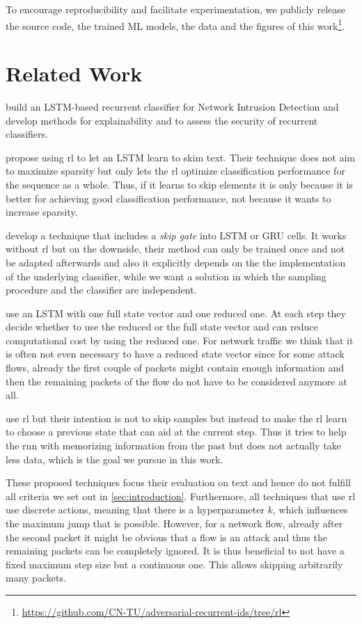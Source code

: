\documentclass[conference]{IEEEtran}
\begin{document}
To encourage reproducibility and facilitate experimentation, we publicly release the source code, the trained ML models, the data and the figures of this work\footnote{\url{https://github.com/CN-TU/adversarial-recurrent-ids/tree/rl}}.

\section{Related Work}

\cite{hartl_explainability_2019} build an LSTM-based \cite{hochreiter_long_1997} recurrent classifier for Network Intrusion Detection and develop methods for explainability and to assess the security of recurrent classifiers.

\cite{yu_learning_2017} propose using \gls{rl} to let an LSTM learn to skim text. Their technique does not aim to maximize sparsity but only lets the \gls{rl} optimize classification performance for the sequence as a whole. Thus, if it learns to skip elements it is only because it is better for achieving good classification performance, not because it wants to increase sparsity.

\cite{campos_skip_2018} develop a technique that includes a \textit{skip gate} into LSTM or GRU \cite{cho_learning_2014} cells. It works without \gls{rl} but on the downside, their method can only be trained once and not be adapted afterwards and also it explicitly depends on the the implementation of the underlying classifier, while we want a solution in which the sampling procedure and the classifier are independent.

\cite{seo_neural_2018} use an LSTM with one full state vector and one reduced one. At each step they decide whether to use the reduced or the full state vector and can reduce computational cost by using the reduced one. For network traffic we think that it is often not even necessary to have a reduced state vector since for some attack flows, already the first couple of packets might contain enough information and then the remaining packets of the flow do not have to be considered anymore at all.

\cite{gui_long_2018} use \gls{rl} but their intention is not to skip samples but instead to make the \gls{rl} learn to choose a previous state that can aid at the current step. Thus it tries to help the \gls{rnn} with memorizing information from the past but does not actually take less data, which is the goal we pursue in this work.

These proposed techniques focus their evaluation on text and hence do not fulfill all criteria we set out in \autoref{sec:introduction}. Furthermore, all techniques that use \gls{rl} use discrete actions, meaning that there is a hyperparameter $k$, which influences the maximum jump that is possible. However, for a network flow, already after the second packet it might be obvious that a flow is an attack and thus the remaining packets can be completely ignored. It is thus beneficial to not have a fixed maximum step size but a continuous one. This allows skipping arbitrarily many packets.
\end{document}
